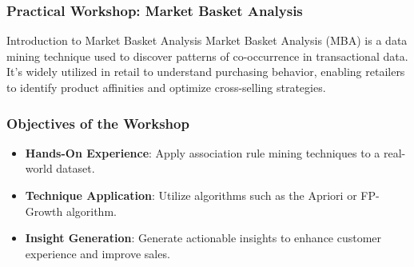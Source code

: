 \documentclass{beamer}
\begin{document}
\begin{frame}[fragile]
    \frametitle{Practical Workshop: Market Basket Analysis}
    \begin{block}{Introduction to Market Basket Analysis}
        Market Basket Analysis (MBA) is a data mining technique used to discover patterns of co-occurrence in transactional data. It's widely utilized in retail to understand purchasing behavior, enabling retailers to identify product affinities and optimize cross-selling strategies.
    \end{block}
\end{frame}

\begin{frame}[fragile]
    \frametitle{Objectives of the Workshop}
    \begin{itemize}
        \item \textbf{Hands-On Experience}: Apply association rule mining techniques to a real-world dataset.
        \item \textbf{Technique Application}: Utilize algorithms such as the Apriori or FP-Growth algorithm.
        \item \textbf{Insight Generation}: Generate actionable insights to enhance customer experience and improve sales.
    \end{itemize}
\end{frame}
\end{document}
